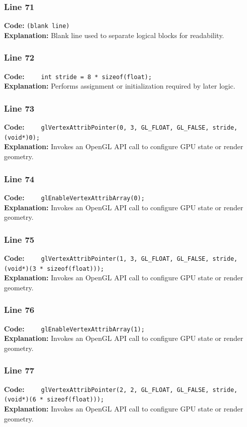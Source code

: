 \documentclass[11pt,a4paper]{article}
\begin{document}
\subsubsection*{Line 71}
\textbf{Code:} \texttt{(blank line)}\\
\textbf{Explanation:} Blank line used to separate logical blocks for readability.

\subsubsection*{Line 72}
\textbf{Code:} \verb|    int stride = 8 * sizeof(float);|\\
\textbf{Explanation:} Performs assignment or initialization required by later logic.

\subsubsection*{Line 73}
\textbf{Code:} \verb|    glVertexAttribPointer(0, 3, GL_FLOAT, GL_FALSE, stride, (void*)0);|\\
\textbf{Explanation:} Invokes an OpenGL API call to configure GPU state or render geometry.

\subsubsection*{Line 74}
\textbf{Code:} \verb|    glEnableVertexAttribArray(0);|\\
\textbf{Explanation:} Invokes an OpenGL API call to configure GPU state or render geometry.

\subsubsection*{Line 75}
\textbf{Code:} \verb|    glVertexAttribPointer(1, 3, GL_FLOAT, GL_FALSE, stride, (void*)(3 * sizeof(float)));|\\
\textbf{Explanation:} Invokes an OpenGL API call to configure GPU state or render geometry.

\subsubsection*{Line 76}
\textbf{Code:} \verb|    glEnableVertexAttribArray(1);|\\
\textbf{Explanation:} Invokes an OpenGL API call to configure GPU state or render geometry.

\subsubsection*{Line 77}
\textbf{Code:} \verb|    glVertexAttribPointer(2, 2, GL_FLOAT, GL_FALSE, stride, (void*)(6 * sizeof(float)));|\\
\textbf{Explanation:} Invokes an OpenGL API call to configure GPU state or render geometry.
\end{document}
